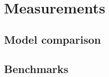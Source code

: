\section{Measurements}\label{sec:measurements}

\subsection{Model comparison}

\subsection{Benchmarks}
